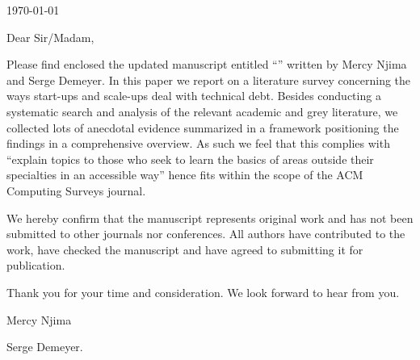 
\begin{flushright}
\today
\end{flushright}

\noindent
Dear Sir/Madam,

\vspace{2em}
Please find enclosed the updated manuscript entitled ``\paperTitle'' written by Mercy Njima and Serge Demeyer.
In this paper we report on a literature survey concerning the ways start-ups and scale-ups deal with technical debt.
Besides conducting a systematic search and analysis of the relevant academic and grey literature, we collected lots of anecdotal evidence summarized in a framework positioning the findings in a comprehensive overview.
As such we feel that this complies with ``explain topics to those who seek to learn the basics of areas outside their specialties in an accessible way'' hence fits within the scope of the ACM Computing Surveys journal.

We hereby confirm that the manuscript represents original work and has not been submitted to other journals nor conferences.
All authors have contributed to the work, have checked the manuscript and have agreed to submitting it for publication.


\vspace{2em}
\noindent
Thank you for your time and consideration.
We look forward to hear from you.


\vspace{2em}
\noindent
Mercy Njima

\noindent
Serge Demeyer.